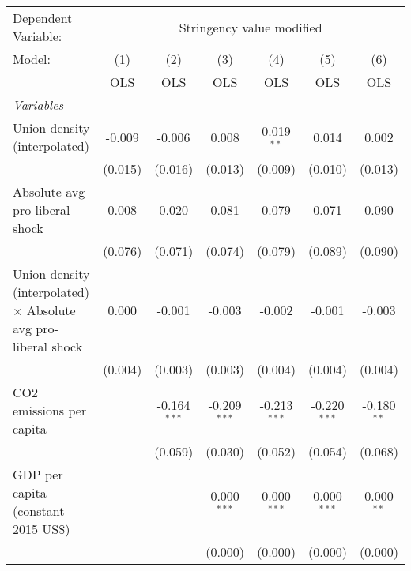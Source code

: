 
\begingroup
\centering
\begin{tabular}{lcccccc}
   \toprule
   Dependent Variable: & \multicolumn{6}{c}{Stringency value modified}\\
   Model:                                                                & (1)     & (2)            & (3)            & (4)            & (5)            & (6)\\  
                                                                         &  OLS    & OLS            & OLS            & OLS            & OLS            & OLS\\  
   \midrule
   \emph{Variables}\\
   Union density (interpolated)                                          & -0.009  & -0.006         & 0.008          & 0.019$^{**}$   & 0.014          & 0.002\\   
                                                                         & (0.015) & (0.016)        & (0.013)        & (0.009)        & (0.010)        & (0.013)\\   
   Absolute avg pro-liberal shock                                        & 0.008   & 0.020          & 0.081          & 0.079          & 0.071          & 0.090\\   
                                                                         & (0.076) & (0.071)        & (0.074)        & (0.079)        & (0.089)        & (0.090)\\   
   Union density (interpolated) $\times$ Absolute avg pro-liberal shock  & 0.000   & -0.001         & -0.003         & -0.002         & -0.001         & -0.003\\   
                                                                         & (0.004) & (0.003)        & (0.003)        & (0.004)        & (0.004)        & (0.004)\\   
   CO2 emissions per capita                                              &         & -0.164$^{***}$ & -0.209$^{***}$ & -0.213$^{***}$ & -0.220$^{***}$ & -0.180$^{**}$\\   
                                                                         &         & (0.059)        & (0.030)        & (0.052)        & (0.054)        & (0.068)\\   
   GDP per capita (constant 2015 US\$)                                   &         &                & 0.000$^{***}$  & 0.000$^{***}$  & 0.000$^{***}$  & 0.000$^{**}$\\   
                                                                         &         &                & (0.000)        & (0.000)        & (0.000)        & (0.000)\\   

\end{tabular}
